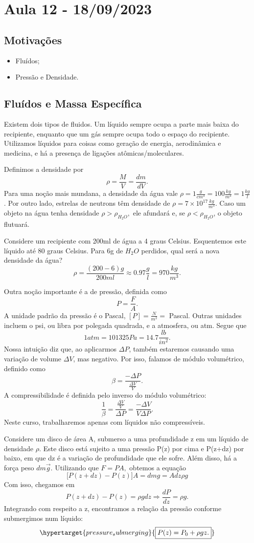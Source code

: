 \documentclass[PhysicsII/physicsII_notes.tex]{subfiles}
\begin{document}
\section{Aula 12 - 18/09/2023}
\subsection{Motivações}
\begin{itemize}
	\item Fluídos;
	\item Pressão e Densidade.
\end{itemize}
\subsection{Fluídos e Massa Específica}
Existem dois tipos de fluidos. Um líquido sempre ocupa a parte mais baixa do recipiente, enquanto que um gás
sempre ocupa todo o espaço do recipiente. Utilizamos líquidos para coisas como geração de energia, aerodinâmica e medicina,
e há a presença de ligações atômicas/moleculares.

Definimos a densidade por
\[
	\rho = \frac{M}{V} = \frac{dm}{dV}.
\]
Para uma noção mais mundana, a densidade da água vale \(\rho = 1 \frac{g}{cm^{3}} = 100 \frac{kg}{m^{3}} = 1 \frac{kg}{l}\). Por outro lado, estrelas de neutrons
têm densidade de \(\rho = 7\times 10^{17}\frac{kg}{m^{3}}\). Caso um objeto na água tenha densidade \(\rho > \rho_{H_{2}O},\) ele afundará e, se
\(\rho < \rho_{H_{2}O}\), o objeto flutuará.
\begin{example}
	Considere um recipiente com 200ml de água a 4 graus Celsius. Esquentemos este líquido até 80 graus Celsius.
	Para 6g de \(H_{2}O\) perdidos, qual será a nova densidade da água?
	\[
		\rho = \frac{(200 - 6)g}{200ml}\approx 0.97 \frac{g}{l} = 970 \frac{kg}{m^{3}}.
	\]
\end{example}
Outra noção importante é a de pressão, definida como
\[
	P = \frac{F}{A}.
\]
A unidade padrão da pressão é o Pascal, \([P]= \frac{N}{m^{2}} =\) Pascal. Outras unidades incluem o psi,
ou libra por polegada quadrada, e a atmosfera, ou atm. Segue que
\[
	1atm = 101325 Pa = 14.7 \frac{lb}{in^{2}}.
\]
Nossa intuição diz que, ao aplicarmos \(\Delta P\), também estaremos causando uma variação de volume \(\Delta V\), mas negativo.
Por isso, falamos de módulo volumétrico, definido como
\[
	\beta = \frac{-\Delta P}{\frac{\Delta V}{V}}.
\]
A compressibilidade é definida pelo inverso do módulo volumétrico:
\[
	\frac{1}{\beta } = \frac{\frac{\Delta V}{V}}{\Delta P} = \frac{-\Delta V}{V\Delta P}.
\]
Neste curso, trabalharemos apenas com líquidos não compressíveis.

Considere um disco de área A, submerso a uma profundidade z em um líquido de densidade \(\rho \).
Este disco está sujeito a uma pressão P(z) por cima e P(z+dz) por baixo, em que dz é a variação de profundidade que ele sofre.
Além disso, há a força peso \(dm \vec{g}\). Utilizando que \(F = P A,\) obtemos a equação
\[
	\biggl[P(z+dz) - P(z)\biggr]A = dmg = Adz\rho g
\]
Com isso, chegamos em
\[
	P(z+dz) - P(z) = \rho g dz \Rightarrow \frac{dP}{dz} = \rho g.
\]
Integrando com respeito a z, encontramos a relação da pressão conforme submergimos num líquido:
\[
	\hypertarget{pressure_submerging}{\boxed{P(z) = P_{0}+\rho gz.}}
\]
\end{document}

